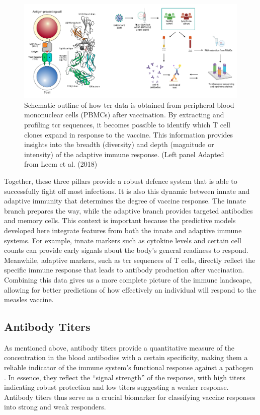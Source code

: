 \documentclass[12pt,a4paper]{report}
\begin{document}
\begin{figure}[h]
  \centering
  \includegraphics[width=1\textwidth]{images/TCR_profiling.png}
  \caption[ \gls{tcr} sequencing Workflow]{Schematic outline of how \gls{tcr} data is obtained from peripheral blood mononuclear cells (PBMCs) after vaccination. By extracting and profiling \gls{tcr} sequences, it becomes possible to identify which T cell clones expand in response to the vaccine. This information provides insights into the breadth (diversity) and depth (magnitude or intensity) of the adaptive immune response. (Left panel Adapted from Leem et al. (2018) \cite{Leem2018IMGTHLA}}
  \label{fig:TCR_profiling}
\end{figure}

\noindent
Together, these three pillars provide a robust defence system that is able to successfully fight off most infections. It is also this dynamic between innate and adaptive immunity that determines the degree of vaccine response. The innate branch prepares the way, while the adaptive branch provides targeted antibodies and memory cells. This context is important because the predictive models developed here integrate features from both the innate and adaptive immune systems. For example, innate markers such as cytokine levels and certain cell counts can provide early signals about the body's general readiness to respond. Meanwhile, adaptive markers, such as \gls{tcr} sequences of T cells, directly reflect the specific immune response that leads to antibody production after vaccination. Combining this data gives us a more complete picture of the immune landscape, allowing for better predictions of how effectively an individual will respond to the measles vaccine.

\subsection{Antibody Titers}
\label{sec:antibody_titers}
As mentioned above, antibody titers provide a quantitative measure of the concentration in the blood antibodies with a certain specificity, making them a reliable indicator of the immune system’s functional response against a pathogen \cite{plotkin2010correlates}. In essence, they reflect the “signal strength” of the response, with high titers indicating robust protection and low titers suggesting a weaker response. Antibody titers thus serve as a crucial biomarker for classifying vaccine responses into strong and weak responders.
\end{document}
